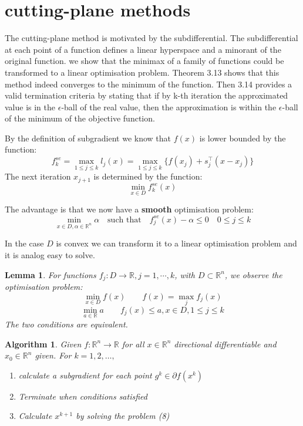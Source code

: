 \documentclass[a4paper,11pt,fleqn, draft]{book}
\newtheorem{algorithmthm}{Algorithm}[section]
\newtheorem{lemma}[theorem]{Lemma}
\theoremstyle{definition}
\theoremstyle{remark}
\begin{document}
\section{cutting-plane methods}
The cutting-plane method is motivated by the subdifferential. The subdifferential at each point of a function defines a linear hyperspace and a minorant of the original function. we show that the minimax of a family of functions could be transformed to a linear optimisation problem. Theorem 3.13 shows that this method indeed converges to the minimum of the function. Then 3.14 provides a valid termination criteria by stating that if by k-th iteration the approximated value is in the $\epsilon$-ball of the real value, then the approximation is within the $\epsilon$-ball of the minimum of the objective function.

By the definition of subgradient we know that $f(x)$ is lower bounded by the function:
\begin{equation} 
	f^{se}_k = \max_{1 \leq j \leq k} l_j(x) = \max_{1 \leq j \leq k} \{f(x_j) + s_j^\top (x - x_j)\}
\end{equation} 
The next iteration $x_{j + 1}$ is determined by the function:
\begin{equation*}
	\min_{x \in D} f_k^{se} (x)
\end{equation*}

The advantage is that we now have a \textbf{smooth} optimisation problem:
\begin{equation}
	\min_{x \in D, \alpha \in \mathbb{R}^n} \alpha \quad \text{such that} \quad f_j^{se}(x) - \alpha \leq 0 \quad 0 \leq j \leq k
\end{equation}

In the case $D$ is convex we can transform it to a linear optimisation problem and it is analog easy to solve.

\begin{lemma}
	For functions $f_j: D \longrightarrow \mathbb{R}, j = 1, \cdots, k$, with $D \subset \mathbb{R}^n$, we observe the optimisation problem:
	\begin{equation}
		\min_{x \in D} f(x) \qquad f(x) = \max_j f_j(x)
	\end{equation}
	\begin{equation}
		\min_{ a \in \mathbb{R} } a \qquad f_j(x) \leq a, x\in D, 1 \leq j \leq k
	\end{equation}
	The two conditions are equivalent.
\end{lemma}

\begin{algorithmthm}
	Given $f : \mathbb{R}^n \longrightarrow \mathbb{R}$ for all $x \in \mathbb{R}^n$ directional differentiable and $x_0 \in \mathbb{R}^n$ given. For $k = 1, 2, \dots, $
	\begin{enumerate}
		\item calculate a subgradient for each point $g^k \in \partial f(x^k)$
		\item Terminate when conditions satisfied
		\item Calculate $x^{k + 1}$ by solving the problem (8)
	\end{enumerate}
\end{algorithmthm}
\end{document}
